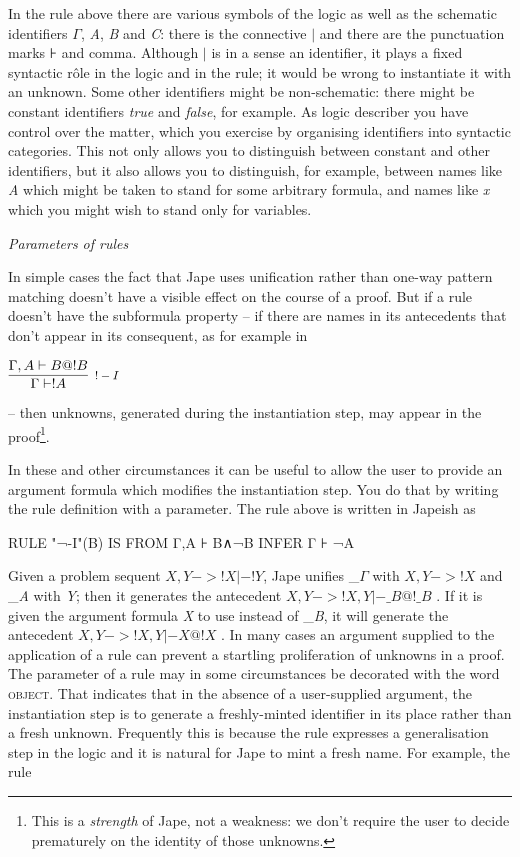\documentclass[11pt]{book}
\newcommand{\reason}[1]{\scalebox{0.85}{#1}}
\begin{document}
In the rule above there are various symbols of the logic as well as the schematic identifiers \ensuremath{\Gamma}, \textit{A}, \textit{B} and \textit{C}: there is the connective \ensuremath{|} and there are the punctuation marks ⊦ and comma. Although \ensuremath{|} is in a sense an identifier, it plays a fixed syntactic r\^{o}le in the logic and in the rule; it would be wrong to instantiate it with an unknown. Some other identifiers might be non-schematic: there might be constant identifiers \textit{true} and \textit{false}, for example. As logic describer you have control over the matter, which you exercise by organising identifiers into syntactic categories. This not only allows you to distinguish between constant and other identifiers, but it also allows you to distinguish, for example, between names like \textit{A} which might be taken to stand for some arbitrary formula, and names like \textit{x} which you might wish to stand only for variables.


\textit{Parameters of rules}


In simple cases the fact that Jape uses unification rather than one-way pattern matching doesn't have a visible effect on the course of a proof. But if a rule doesn't have the subformula property -- if there are names in its antecedents that don't appear in its consequent, as for example in


$\infer[\reason{$!-I$}]
       {\Gamma  |- !A}
       {\Gamma,A |- B@!B}$

-- then unknowns, generated during the instantiation step, may appear in the proof\footnote{This is a \textit{strength} of Jape, not a weakness: we don't require the user to decide prematurely on the identity of those unknowns.}.


In these and other circumstances it can be useful to allow the user to provide an argument formula which modifies the instantiation step. You do that by writing the rule definition with a parameter. The rule above is written in Japeish as

RULE "¬-I"(B) IS FROM Γ,A ⊦ B∧¬B INFER Γ ⊦ ¬A


Given a problem sequent $X,Y->!X |- !Y$, Jape unifies \_\ensuremath{\Gamma} with $X,Y->!X$ and \_\textit{A} with \textit{Y}; then it generates the antecedent $X,Y->!X,Y |- \_B@!\_B$ . If it is given the argument formula \textit{X} to use instead of \_\textit{B}, it will generate the antecedent $X,Y->!X,Y |- X@!X$ . In many cases an argument supplied to the application of a rule can prevent a startling proliferation of unknowns in a proof.\\
The parameter of a rule may in some circumstances be decorated with the word \textsc{object}. That indicates that in the absence of a user-supplied argument, the instantiation step is to generate a freshly-minted identifier in its place rather than a fresh unknown. Frequently this is because the rule expresses a generalisation step in the logic and it is natural for Jape to mint a fresh name. For example, the rule
\end{document}

